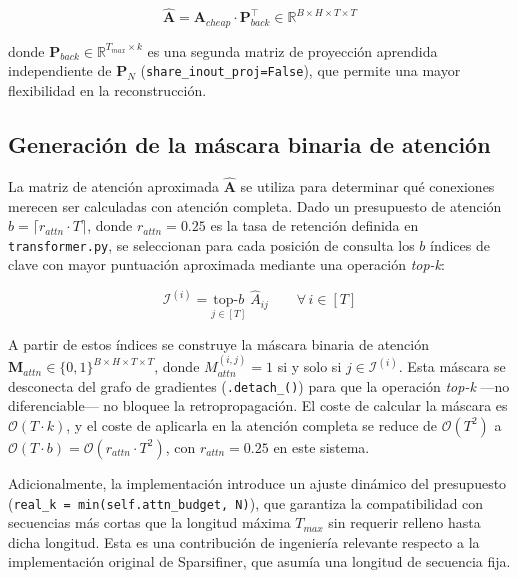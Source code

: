 \begin{equation}
    \hat{\mathbf{A}} = \mathbf{A}_{cheap} \cdot \mathbf{P}_{back}^{\top}
    \in \mathbb{R}^{B \times H \times T \times T}
    \label{eq:approx_attn}
\end{equation}

donde $\mathbf{P}_{back} \in \mathbb{R}^{T_{max} \times k}$ es una segunda matriz de
proyección aprendida independiente de $\mathbf{P}_N$ (\texttt{share\_inout\_proj=False}),
que permite una mayor flexibilidad en la reconstrucción.

\subsection{Generación de la máscara binaria de atención}
\label{subsec:mascara_binaria}

La matriz de atención aproximada $\hat{\mathbf{A}}$ se utiliza para determinar qué
conexiones merecen ser calculadas con atención completa. Dado un presupuesto de atención
$b = \lceil r_{attn} \cdot T \rceil$, donde $r_{attn} = 0.25$ es la tasa de retención
definida en \texttt{transformer.py}, se seleccionan para cada posición de consulta los
$b$ índices de clave con mayor puntuación aproximada mediante una operación \textit{top-k}:

\begin{equation}
    \mathcal{I}^{(i)} = \underset{j \in [T]}{\text{top-}b}\;\hat{A}_{ij}
    \qquad \forall\, i \in [T]
    \label{eq:topk_selection}
\end{equation}

A partir de estos índices se construye la máscara binaria de atención
$\mathbf{M}_{attn} \in \{0,1\}^{B \times H \times T \times T}$, donde
$M_{attn}^{(i,j)} = 1$ si y solo si $j \in \mathcal{I}^{(i)}$. Esta máscara se
desconecta del grafo de gradientes (\texttt{.detach\_()}) para que la operación
\textit{top-k} —no diferenciable— no bloquee la retropropagación. El coste de calcular
la máscara es $\mathcal{O}(T \cdot k)$, y el coste de aplicarla en la atención completa
se reduce de $\mathcal{O}(T^2)$ a $\mathcal{O}(T \cdot b) = \mathcal{O}(r_{attn} \cdot T^2)$,
con $r_{attn} = 0.25$ en este sistema.

Adicionalmente, la implementación introduce un ajuste dinámico del presupuesto
(\texttt{real\_k = min(self.attn\_budget, N)}), que garantiza la compatibilidad con
secuencias más cortas que la longitud máxima $T_{max}$ sin requerir relleno hasta dicha
longitud. Esta es una contribución de ingeniería relevante respecto a la implementación
original de Sparsifiner, que asumía una longitud de secuencia fija.

